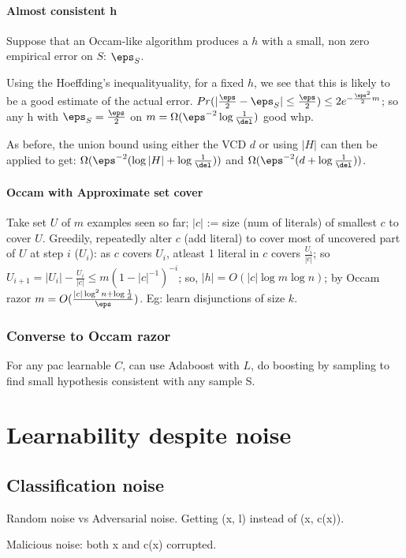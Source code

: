\documentclass[oneside, article]{memoir}
\begin{document}
\subsubsection{Almost consistent h}
Suppose that an Occam-like algorithm produces a $h$ with a small, non zero empirical error on $S$: $\eps_{S}$.

Using the Hoeffding's inequalityuality, for a fixed $h$, we see that this is likely to be a good estimate of the actual error. $Pr(|\frac{\eps}{2} - \eps_{S}| \leq \frac{\eps}{2}) \leq 2e^{-\frac{\eps^{2}}{2}m}$; so any h with $\eps_{S} = \frac{\eps}{2}$ on $m = \Omega(\eps^{-2}\log \frac{1}{\del})$ good whp.

As before, the union bound using either the VCD $d$ or using $|H|$ can then be applied to get: $\Omega(\eps^{-2}(\log|H| + \log \frac{1}{\del}))$ and $\Omega(\eps^{-2}(d + \log \frac{1}{\del}))$.

\subsubsection{Occam with Approximate set cover}
Take set $U$ of $m$ examples seen so far; $|c|$ := size (num of literals) of smallest $c$ to cover $U$. Greedily, repeatedly alter $c$ (add literal) to cover most of uncovered part of $U$ at step $i$ ($U_{i}$): as $c$ covers $U_{i}$, atleast 1 literal in $c$ covers $\frac{U_{i}}{|c|}$; so $U_{i+1} = |U_{i}| - \frac{U_{i}}{|c|} \leq m(1-|c|^{-1})^{-i}$; so, $|h| = O(|c| \log m \log n)$; by Occam razor $m = O( \frac{|c|\log^{2} n + \log \frac{1}{d}}{\eps})$. Eg: learn disjunctions of size $k$.

\subsection{Converse to Occam razor}
For any pac learnable $C$, can use Adaboost with $L$, do boosting by sampling to find small hypothesis consistent with any sample S.

\chapter{Learnability despite noise}
\section{Classification noise}
Random noise vs Adversarial noise. Getting (x, l) instead of (x, c(x)).

Malicious noise: both x and c(x) corrupted.
\end{document}
